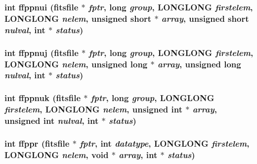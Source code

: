 \subsubsection{\setlength{\rightskip}{0pt plus 5cm}int ffppnui (\bf{fitsfile} $\ast$ {\em fptr}, long {\em group}, \bf{LONGLONG} {\em firstelem}, \bf{LONGLONG} {\em nelem}, unsigned short $\ast$ {\em array}, unsigned short {\em nulval}, int $\ast$ {\em status})}\label{test_2shm__client_2fitsio_8h_525842763bdaa4507a3a935d347a0462}


\subsubsection{\setlength{\rightskip}{0pt plus 5cm}int ffppnuj (\bf{fitsfile} $\ast$ {\em fptr}, long {\em group}, \bf{LONGLONG} {\em firstelem}, \bf{LONGLONG} {\em nelem}, unsigned long $\ast$ {\em array}, unsigned long {\em nulval}, int $\ast$ {\em status})}\label{test_2shm__client_2fitsio_8h_fc1d4fc6ae72ad09956653077c3813af}


\subsubsection{\setlength{\rightskip}{0pt plus 5cm}int ffppnuk (\bf{fitsfile} $\ast$ {\em fptr}, long {\em group}, \bf{LONGLONG} {\em firstelem}, \bf{LONGLONG} {\em nelem}, unsigned int $\ast$ {\em array}, unsigned int {\em nulval}, int $\ast$ {\em status})}\label{test_2shm__client_2fitsio_8h_95d87d24a1245de2f3cb4178a78cac04}


\subsubsection{\setlength{\rightskip}{0pt plus 5cm}int ffppr (\bf{fitsfile} $\ast$ {\em fptr}, int {\em datatype}, \bf{LONGLONG} {\em firstelem}, \bf{LONGLONG} {\em nelem}, void $\ast$ {\em array}, int $\ast$ {\em status})}\label{test_2shm__client_2fitsio_8h_f931a67d7160cdaf855057098337511f}


